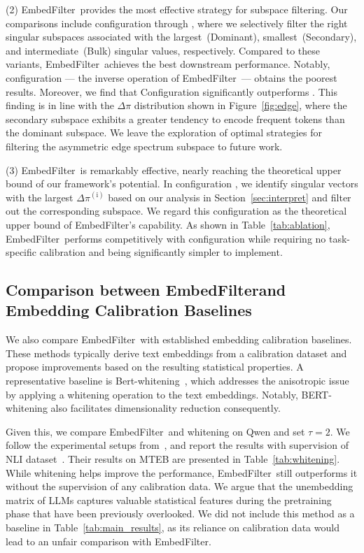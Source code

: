 \documentclass{llmxive}
\providecommand{\name}{EmbedFilter}
\providecommand{\circledNum}[1]{  \tikz[baseline, anchor=base]{\node[draw,circle,inner sep=0.1pt, font=\fontsize{7.5}{10}\selectfont] {#1};}}
\begin{document}
(2) \name\ provides the most effective strategy for subspace filtering.
Our comparisons include configuration \circledNum{3} through \circledNum{5}, where we selectively filter the right singular subspaces associated with the largest~(Dominant), smallest~(Secondary), and  intermediate~(Bulk) singular values, respectively.
Compared to these variants, \name\ achieves the best downstream performance.
Notably, configuration \circledNum{5} --- the inverse operation of \name\ --- obtains the poorest results. 
Moreover, we find that Configuration \circledNum{4} significantly outperforms \circledNum{5}.
This finding is in line with the \(\Delta \pi\) distribution shown in Figure~\ref{fig:edge}, where the secondary subspace exhibits a greater tendency to encode frequent tokens than the dominant subspace. 
We leave the exploration of optimal strategies for filtering the asymmetric edge spectrum subspace to future work.

(3) \name\ is remarkably effective, nearly reaching the theoretical upper bound of our framework's potential. In configuration \circledNum{6}, we identify singular vectors with the largest $\Delta \pi^{\mathrm{(i)}}$ based on our analysis in Section~\ref{sec:interpret} and filter out the corresponding subspace. 
We regard this configuration as the theoretical upper bound of \name's capability. As shown in Table~\ref{tab:ablation}, \name\ performs competitively with configuration \circledNum{6} while requiring no task-specific calibration and being significantly simpler to implement.


\subsection{Comparison between \name and  Embedding Calibration Baselines}
We also compare \name\ with established embedding calibration baselines.
These methods typically derive text embeddings from a calibration dataset and propose improvements based on the resulting statistical properties.
A representative baseline is Bert-whitening~\cite{whitening}, which addresses the anisotropic issue by applying a whitening operation to the text embeddings.
Notably, BERT-whitening also facilitates dimensionality reduction consequently.

Given this, we compare \name~and whitening on Qwen and set \(\tau=2\).
We follow the experimental setups from~\cite{whitening}, and report the results with supervision of NLI dataset~\cite{allni}.
Their results on MTEB are presented in Table~\ref{tab:whitening}.
While whitening helps improve the performance, \name~still outperforms it without the supervision of any calibration data.
We argue that the unembedding matrix of LLMs captures valuable statistical features during the pretraining phase that have been previously overlooked.
We did not include this method as a baseline in Table~\ref{tab:main_results}, as its reliance on calibration data would lead to an unfair comparison with \name.
\end{document}
